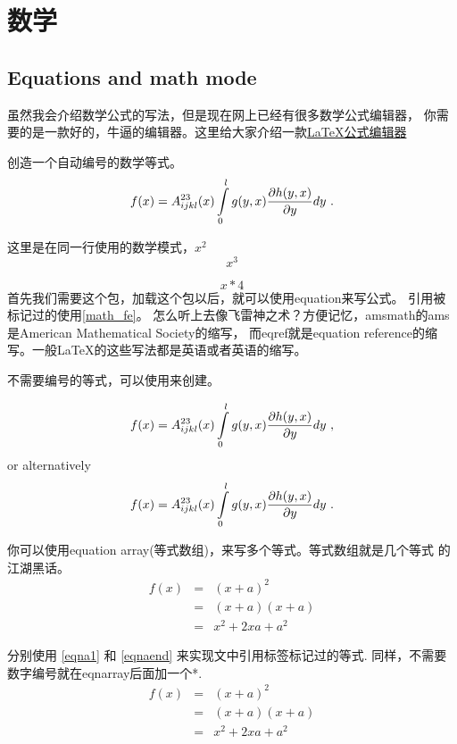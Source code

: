 
\chapter{数学}


\section{Equations and math mode}

虽然我会介绍数学公式的写法，但是现在网上已经有很多数学公式编辑器，
你需要的是一款好的，牛逼的编辑器。这里给大家介绍一款\href{https://www.latexlive.com/}{\LaTeX 公式编辑器}

创造一个自动编号的数学等式。
\begin{equation}
	f(x)
	= A^{23}_{ijkl}(x) \int_0^l\limits g(y,x) \frac{\partial h(y,x)}{\partial y} d y \ .
	\label{math_fe}
\end{equation}

这里是在同一行使用的数学模式，$x^2$
$$
	x^3
$$

\[ 
	x*4
\]
首先我们需要这个包，加载这个包以后，就可以使用equation来写公式。
引用被标记过的使用\eqref{math_fe}。
怎么听上去像飞雷神之术？方便记忆，amsmath的ams是American Mathematical Society的缩写，
而eqref就是equation reference的缩写。一般{LaTeX}的这些写法都是英语或者英语的缩写。

不需要编号的等式，可以使用来创建。

\begin{equation*}
	f(x)
	= A^{23}_{ijkl}(x) \int_0^l\limits g(y,x) \frac{\partial h(y,x)}{\partial y} d y \ ,
\end{equation*}
or alternatively 
\[
	f(x)
	= A^{23}_{ijkl}(x) \int_0^l\limits g(y,x) \frac{\partial h(y,x)}{\partial y} d y \ .
\]

你可以使用equation array(等式数组)，来写多个等式。等式数组就是几个等式
的江湖黑话。
\begin{eqnarray}
	f(x)
		&=& (x+a)^2 \label{eqna1} \\
		&=& (x+a)(x+a) \label{eqna2}\\
		&=& x^2 + 2 x a + a^2
	\label{eqnaend}
\end{eqnarray}

分别使用 \eqref{eqna1} 和 \eqref{eqnaend} 来实现文中引用标签标记过的等式. 
同样，不需要数字编号就在eqnarray后面加一个*.
\begin{eqnarray*}
	f(x)
		&=& (x+a)^2 \\
		&=& (x+a)(x+a) \\
		&=& x^2 + 2 x a + a^2
\end{eqnarray*}

